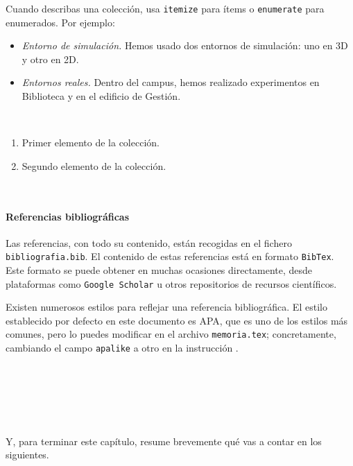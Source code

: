 Cuando describas una colección, usa \texttt{itemize} para ítems o \texttt{enumerate} para enumerados. Por ejemplo:

\begin{itemize}
 \item \textit{Entorno de simulación.} Hemos usado dos entornos de simulación: uno en 3D y otro en 2D.
 \item \textit{Entornos reales.} Dentro del campus, hemos realizado experimentos en Biblioteca y en el edificio de Gestión.
\end{itemize}\

\begin{enumerate}
 \item Primer elemento de la colección.
 \item Segundo elemento de la colección.
\end{enumerate}\

\paragraph{Referencias bibliográficas}
\label{sec:referencias}


Las referencias, con todo su contenido, están recogidas en el fichero \texttt{bibliografia.bib}. El contenido de estas referencias está en formato \texttt{BibTex}. Este formato se puede obtener en muchas ocasiones directamente, desde plataformas como \texttt{Google Scholar} u otros repositorios de recursos científicos.

Existen numerosos estilos para reflejar una referencia bibliográfica. El estilo establecido por defecto en este documento es APA, que es uno de los estilos más comunes, pero lo puedes modificar en el archivo \texttt{memoria.tex}; concretamente, cambiando el campo \verb|apalike| a otro en la instrucción \verb||. 

\

\

\

Y, para terminar este capítulo, resume brevemente qué vas a contar en los siguientes.
